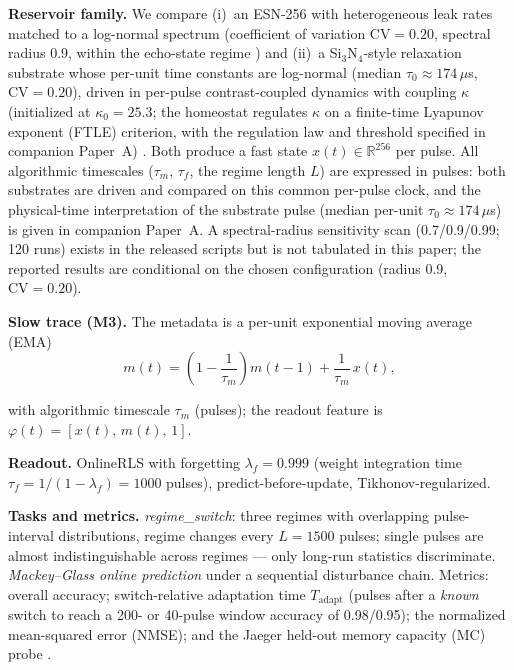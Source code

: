 \documentclass[preprint,12pt]{elsarticle}
\begin{document}
\textbf{Reservoir family.} We compare (i)~an ESN-256
\cite{lukosevicius2012} with heterogeneous
leak rates matched to a log-normal spectrum (coefficient of variation
$\mathrm{CV}=0.20$, spectral
radius 0.9, within the echo-state regime \cite{yildiz2012}) and (ii)~a Si$_3$N$_4$-style relaxation substrate whose
per-unit time constants are log-normal (median $\tau_0\approx174\,\mu$s,
$\mathrm{CV}=0.20$), driven in per-pulse contrast-coupled dynamics with
coupling $\kappa$ (initialized at $\kappa_0=25.3$; the homeostat
regulates $\kappa$ on a finite-time Lyapunov exponent (FTLE) criterion,
with the regulation law and threshold specified in companion Paper~A)
\cite{companionA}. Both produce a
fast state
$x(t)\in\mathbb{R}^{256}$ per pulse. All algorithmic timescales
($\tau_m$, $\tau_f$, the regime length $L$) are expressed in pulses:
both substrates are driven and compared on this common per-pulse clock,
and the physical-time interpretation of the substrate pulse (median
per-unit $\tau_0\approx174\,\mu$s) is given in companion Paper~A. A
spectral-radius sensitivity scan (0.7/0.9/0.99; 120 runs) exists in the
released scripts but is not tabulated in this paper; the reported
results are conditional on the chosen configuration (radius 0.9,
$\mathrm{CV}=0.20$).

\textbf{Slow trace (M3).} The metadata is a per-unit exponential moving
average (EMA)
\begin{equation}
m(t) = \left(1-\frac{1}{\tau_m}\right) m(t-1)
     + \frac{1}{\tau_m}\, x(t),
\label{eq:ema}
\end{equation}
{\sloppy
with algorithmic timescale $\tau_m$ (pulses); the readout feature is
$\varphi(t) = [x(t),\, m(t),\, 1]$.\par}

\textbf{Readout.} OnlineRLS with forgetting $\lambda_f=0.999$ (weight
integration time $\tau_f = 1/(1-\lambda_f)=1000$ pulses),
predict-before-update, Tikhonov-regularized.

\textbf{Tasks and metrics.} \emph{regime\_switch}: three regimes with
overlapping pulse-interval distributions, regime changes every
$L=1500$ pulses; single pulses are almost indistinguishable across regimes
--- only long-run statistics discriminate. \emph{Mackey--Glass online
prediction} under a sequential disturbance chain. Metrics: overall
accuracy; switch-relative adaptation time $T_{\mathrm{adapt}}$ (pulses
after a \emph{known} switch to reach a 200- or 40-pulse window accuracy of
0.98/0.95); the normalized mean-squared error (NMSE); and the Jaeger
held-out memory capacity (MC) probe \cite{jaeger2002mc,white2004}.
\end{document}
